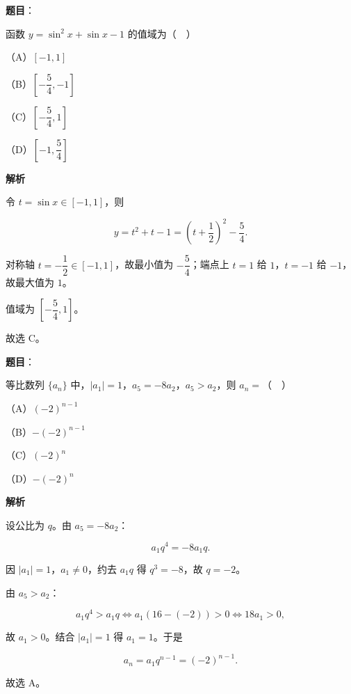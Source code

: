 \begin{answer}

\textbf{题目}：

函数 $y=\sin^2x+\sin x-1$ 的值域为（　）

（A）$[-1,1]$

（B）$\left[-\dfrac54,-1\right]$

（C）$\left[-\dfrac54,1\right]$

（D）$\left[-1,\dfrac54\right]$

\textbf{解析}

令 $t=\sin x\in[-1,1]$，则

\nopagebreak[4]
\[y=t^2+t-1=\left(t+\frac12\right)^2-\frac54.\]

对称轴 $t=-\dfrac12\in[-1,1]$，故最小值为 $-\dfrac54$；端点上 $t=1$ 给 $1$，$t=-1$ 给 $-1$，故最大值为 $1$。

值域为 $\left[-\dfrac54,1\right]$。

故选 C。


\end{answer}
\begin{answer}

\textbf{题目}：

等比数列 $\{a_n\}$ 中，$|a_1|=1$，$a_5=-8a_2$，$a_5>a_2$，则 $a_n=$（　）

（A）$(-2)^{n-1}$

（B）$-(-2)^{n-1}$

（C）$(-2)^n$

（D）$-(-2)^n$

\textbf{解析}

设公比为 $q$。由 $a_5=-8a_2$：

\nopagebreak[4]
\[a_1q^4=-8a_1q.\]

因 $|a_1|=1$，$a_1\neq0$，约去 $a_1q$ 得 $q^3=-8$，故 $q=-2$。

由 $a_5>a_2$：

\nopagebreak[4]
\[a_1q^4>a_1q\iff a_1(16-(-2))>0\iff 18a_1>0,\]

故 $a_1>0$。结合 $|a_1|=1$ 得 $a_1=1$。于是

\nopagebreak[4]
\[a_n=a_1q^{n-1}=(-2)^{n-1}.\]

故选 A。


\end{answer}
